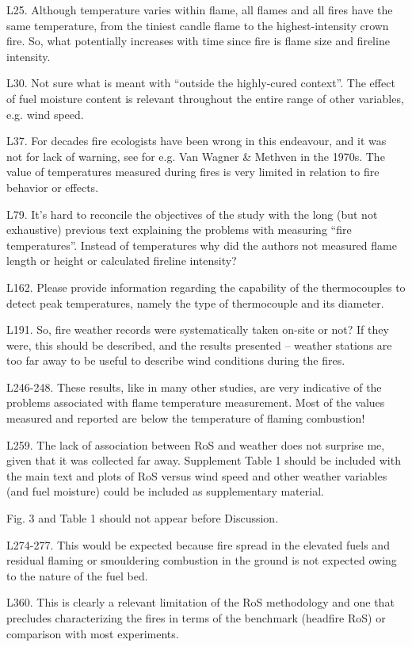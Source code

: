 \documentclass[parskip=half]{scrartcl}
\begin{document}
L25. Although temperature varies within flame, all flames and all fires have the same temperature, from the tiniest candle flame to the highest-intensity crown fire. So, what potentially increases with time since fire is flame size and fireline intensity.

L30. Not sure what is meant with “outside the highly-cured context”. The effect of fuel moisture content is relevant throughout the entire range of other variables, e.g. wind speed.

L37. For decades fire ecologists have been wrong in this endeavour, and it was not for lack of warning, see for e.g. Van Wagner \& Methven in the 1970s. The value of temperatures measured during fires is very limited in relation to fire behavior or effects.

L79. It’s hard to reconcile the objectives of the study with the long (but not exhaustive) previous text explaining the problems with measuring ``fire temperatures''. Instead of temperatures why did the authors not measured flame length or height or calculated fireline intensity?

L162. Please provide information regarding the capability of the thermocouples to detect peak temperatures, namely the type of thermocouple and its diameter.

L191. So, fire weather records were systematically taken on-site or not? If they were, this should be described, and the results presented – weather stations are too far away to be useful to describe wind conditions during the fires.

L246-248. These results, like in many other studies, are very indicative of the problems associated with flame temperature measurement. Most of the values measured and reported are below the temperature of flaming combustion!

L259. The lack of association between RoS and weather does not surprise me, given that it was collected far away. Supplement Table 1 should be included with the main text and plots of RoS versus wind speed and other weather variables (and fuel moisture) could be included as supplementary material.

Fig. 3 and Table 1 should not appear before Discussion.

L274-277. This would be expected because fire spread in the elevated fuels and residual flaming or smouldering combustion in the ground is not expected owing to the nature of the fuel bed.

L360. This is clearly a relevant limitation of the RoS methodology and one that precludes characterizing the fires in terms of the benchmark (headfire RoS) or comparison with most experiments.
\end{document}
